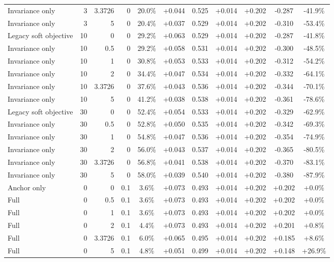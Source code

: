 \begin{table}[htbp]
\begin{tabular}{lrrrccccccc}
Invariance only & 3 & 3.3726 & 0 & 20.0\% & +0.044 & 0.525 & +0.014 & +0.202 & -0.287 & -41.9\% \\
Invariance only & 3 & 5 & 0 & 20.4\% & +0.037 & 0.529 & +0.014 & +0.202 & -0.310 & -53.4\% \\
Legacy soft objective & 10 & 0 & 0 & 29.2\% & +0.063 & 0.529 & +0.014 & +0.202 & -0.287 & -41.8\% \\
Invariance only & 10 & 0.5 & 0 & 29.2\% & +0.058 & 0.531 & +0.014 & +0.202 & -0.300 & -48.5\% \\
Invariance only & 10 & 1 & 0 & 30.8\% & +0.053 & 0.533 & +0.014 & +0.202 & -0.312 & -54.2\% \\
Invariance only & 10 & 2 & 0 & 34.4\% & +0.047 & 0.534 & +0.014 & +0.202 & -0.332 & -64.1\% \\
Invariance only & 10 & 3.3726 & 0 & 37.6\% & +0.043 & 0.536 & +0.014 & +0.202 & -0.344 & -70.1\% \\
Invariance only & 10 & 5 & 0 & 41.2\% & +0.038 & 0.538 & +0.014 & +0.202 & -0.361 & -78.6\% \\
Legacy soft objective & 30 & 0 & 0 & 52.4\% & +0.054 & 0.533 & +0.014 & +0.202 & -0.329 & -62.9\% \\
Invariance only & 30 & 0.5 & 0 & 52.8\% & +0.050 & 0.535 & +0.014 & +0.202 & -0.342 & -69.3\% \\
Invariance only & 30 & 1 & 0 & 54.8\% & +0.047 & 0.536 & +0.014 & +0.202 & -0.354 & -74.9\% \\
Invariance only & 30 & 2 & 0 & 56.0\% & +0.043 & 0.537 & +0.014 & +0.202 & -0.365 & -80.5\% \\
Invariance only & 30 & 3.3726 & 0 & 56.8\% & +0.041 & 0.538 & +0.014 & +0.202 & -0.370 & -83.1\% \\
Invariance only & 30 & 5 & 0 & 58.0\% & +0.039 & 0.540 & +0.014 & +0.202 & -0.380 & -87.9\% \\
Anchor only & 0 & 0 & 0.1 & 3.6\% & +0.073 & 0.493 & +0.014 & +0.202 & +0.202 & +0.0\% \\
Full & 0 & 0.5 & 0.1 & 3.6\% & +0.073 & 0.493 & +0.014 & +0.202 & +0.202 & +0.0\% \\
Full & 0 & 1 & 0.1 & 3.6\% & +0.073 & 0.493 & +0.014 & +0.202 & +0.202 & +0.0\% \\
Full & 0 & 2 & 0.1 & 4.4\% & +0.073 & 0.493 & +0.014 & +0.202 & +0.201 & +0.8\% \\
Full & 0 & 3.3726 & 0.1 & 6.0\% & +0.065 & 0.495 & +0.014 & +0.202 & +0.185 & +8.6\% \\
Full & 0 & 5 & 0.1 & 4.8\% & +0.051 & 0.499 & +0.014 & +0.202 & +0.148 & +26.9\% \\

\end{tabular}
\end{table}
